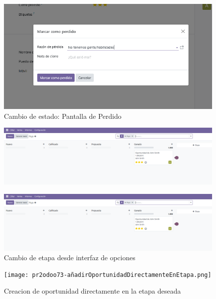 \documentclass[a4paper,12pt]{article}
\begin{document}
\begin{figure}[h!]
    \centering
    \includegraphics[width=1\textwidth]{pr2odoo71-oportunidadPerdida.png}
    \caption{Cambio de estado: Pantalla de Perdido}
\end{figure}
\FloatBarrier

\begin{figure}[h!]
    \centering
    \includegraphics[width=1\textwidth]{pr2odoo72-cambioDeEtapa.png}
    \caption{}
\end{figure}
\FloatBarrier

\begin{figure}[h!]
    \centering
    \includegraphics[width=1\textwidth]{pr2odoo72-cambioDeEtapa.png}
    \caption{Cambio de etapa desde interfaz de opciones}
\end{figure}
\FloatBarrier

\begin{figure}[h!]
    \centering
    \texttt{[image: pr2odoo73-añadirOportunidadDirectamenteEnEtapa.png]}
    \caption{Creacion de oportunidad directamente en la etapa deseada}
\end{figure}
\FloatBarrier
\end{document}
